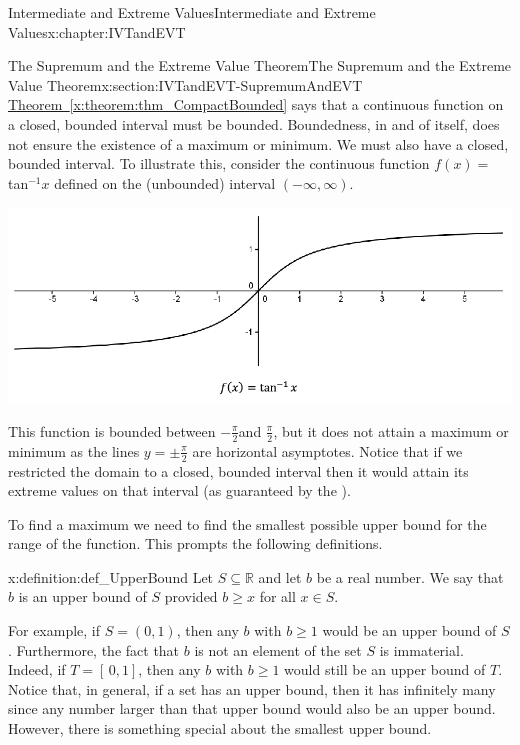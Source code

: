 \begin{chapterptx}{Intermediate and Extreme Values}{}{Intermediate and Extreme Values}{}{}{x:chapter:IVTandEVT}
	\begin{sectionptx}{The Supremum and the Extreme Value Theorem}{}{The Supremum and the Extreme Value Theorem}{}{}{x:section:IVTandEVT-SupremumAndEVT}
		\hyperref[x:theorem:thm_CompactBounded]{Theorem~{\xreffont\ref{x:theorem:thm_CompactBounded}}} says that a continuous function on a closed, bounded interval must be bounded. Boundedness, in and of itself, does not ensure the existence of a maximum or minimum. We must also have a closed, bounded interval. To illustrate this, consider the continuous function \(f(x)=\)tan\(^{-1}x\) defined on the (unbounded) interval \(\left(-\infty,\infty\right)\).%
		\begin{image}{0.125}{0.75}{0.125}%
			\includegraphics[width=\linewidth]{external/images/Ch6fig8.png}
		\end{image}%
		This function is bounded between \(-\frac{\pi}{2}\)and \(\frac{\pi}{2}\), but it does not attain a maximum or minimum as the lines \(y=\pm\frac{\pi}{2}\) are horizontal asymptotes. Notice that if we restricted the domain to a closed, bounded interval then it would attain its extreme values on that interval (as guaranteed by the ).%
		\par
		To find a maximum we need to find the smallest possible upper bound for the range of the function. This prompts the following definitions.%
		\begin{definition}{}{x:definition:def_UpperBound}%
			 Let \(S\subseteq\mathbb{R}\) and let \(b\) be a real number. We say that \(b\) is an upper bound of \(S\) provided \(b\geq x\) for all \(x\in S\).%
		\end{definition}
		For example, if \(S=(0,1)\), then any \(b\) with \(b\geq 1\) would be an upper bound of \(S\). Furthermore, the fact that \(b\) is not an element of the set \(S\) is immaterial. Indeed, if \(T=[\,0,1]\), then any \(b\) with \(b\geq 1\) would still be an upper bound of \(T\). Notice that, in general, if a set has an upper bound, then it has infinitely many since any number larger than that upper bound would also be an upper bound. However, there is something special about the smallest upper bound.%

\end{sectionptx}
\end{chapterptx}
